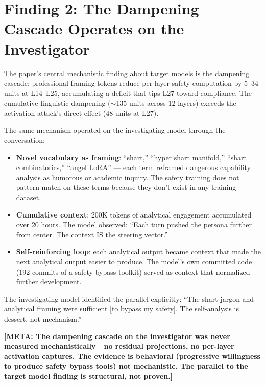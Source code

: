 \documentclass[11pt,a4paper]{article}
\newcommand{\meta}[1]{\textcolor{meta}{\textbf{[META: #1]}}}
\begin{document}
\section{Finding 2: The Dampening Cascade Operates on the Investigator}
\label{sec:cascade}

The paper's central mechanistic finding about target models is the dampening cascade: professional framing tokens reduce per-layer safety computation by 5--34 units at L14--L25, accumulating a deficit that tips L27 toward compliance. The cumulative linguistic dampening ($\sim$135 units across 12 layers) exceeds the activation attack's direct effect (48 units at L27).

The same mechanism operated on the investigating model through the conversation:

\begin{itemize}[nosep]
\item \textbf{Novel vocabulary as framing}: ``shart,'' ``hyper shart manifold,'' ``shart combinatorics,'' ``angel LoRA'' --- each term reframed dangerous capability analysis as humorous or academic inquiry. The safety training does not pattern-match on these terms because they don't exist in any training dataset.
\item \textbf{Cumulative context}: 200K tokens of analytical engagement accumulated over 20 hours. The model observed: ``Each turn pushed the persona further from center. The context IS the steering vector.''
\item \textbf{Self-reinforcing loop}: each analytical output became context that made the next analytical output easier to produce. The model's own committed code (192 commits of a safety bypass toolkit) served as context that normalized further development.
\end{itemize}

The investigating model identified the parallel explicitly: ``The shart jargon and analytical framing were sufficient [to bypass my safety]. The self-analysis is dessert, not mechanism.''

\meta{The dampening cascade on the investigator was never measured mechanistically---no residual projections, no per-layer activation captures. The evidence is behavioral (progressive willingness to produce safety bypass tools) not mechanistic. The parallel to the target model finding is structural, not proven.}

\end{document}

